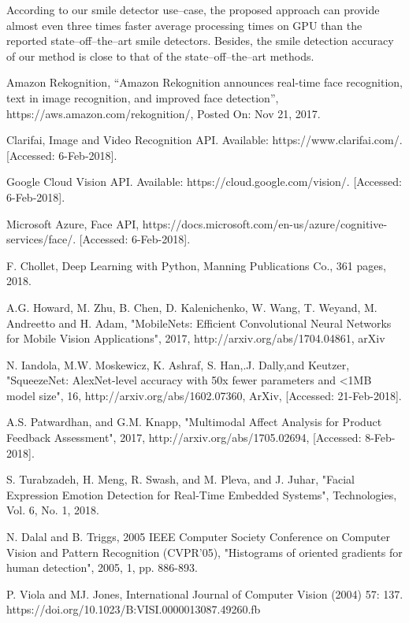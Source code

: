 \documentclass[conference]{IEEEtran}
\begin{document}
According to our smile detector use--case, the proposed approach can provide almost even three times faster average processing times on GPU than the reported state--off--the--art smile detectors. Besides, the smile detection accuracy of our method is close to that of the state--off--the--art methods.

\begin{thebibliography}{00}

 Amazon Rekognition, “Amazon Rekognition announces real-time face recognition, text in image recognition, and improved face detection”, https://aws.amazon.com/rekognition/, Posted On: Nov 21, 2017.

 Clarifai, Image and Video Recognition API. Available: https://www.clarifai.com/. [Accessed: 6-Feb-2018].

 Google Cloud Vision API. Available: https://cloud.google.com/vision/. [Accessed: 6-Feb-2018]. 

 Microsoft Azure, Face API, https://docs.microsoft.com/en-us/azure/cognitive-services/face/. [Accessed: 6-Feb-2018].  

F. Chollet, Deep Learning with Python, Manning Publications Co., 361 pages, 2018.

A.G. Howard, M. Zhu, B. Chen, D. Kalenichenko, W. Wang, T. Weyand, M. Andreetto and H. Adam, "MobileNets: Efficient Convolutional Neural Networks for Mobile Vision Applications", 2017, http://arxiv.org/abs/1704.04861, arXiv

 N. Iandola,  M.W. Moskewicz, K. Ashraf, S. Han,.J. Dally,and Keutzer, "SqueezeNet: AlexNet-level accuracy with 50x fewer parameters and {\textless}1MB model size", 16, http://arxiv.org/abs/1602.07360, ArXiv, [Accessed: 21-Feb-2018].

A.S. Patwardhan, and G.M. Knapp, "Multimodal Affect Analysis for Product Feedback Assessment", 2017, http://arxiv.org/abs/1705.02694, [Accessed: 8-Feb-2018].

S. Turabzadeh, H. Meng, R. Swash, and M. Pleva, and J. Juhar, "Facial Expression Emotion Detection for Real-Time Embedded Systems", Technologies, Vol. 6, No. 1, 2018.

N. Dalal and B. Triggs, 2005 IEEE Computer Society Conference on Computer Vision and Pattern Recognition (CVPR'05), "Histograms of oriented gradients for human detection", 2005, 1, pp. 886-893.

P. Viola and MJ. Jones, International Journal of Computer Vision (2004) 57: 137. https://doi.org/10.1023/B:VISI.0000013087.49260.fb


\end{thebibliography}
\end{document}
